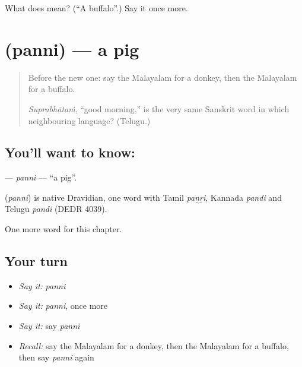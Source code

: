 \begin{tcolorbox}[breakable,colback=teal!4,colframe=teal!35!black,title={Before you move on}]
What does  mean? (\textquotedblleft{}A buffalo\textquotedblright{}.) Say it once more.
\end{tcolorbox}
\section[\texorpdfstring{\ml{പന്നി} (panni)}{പന്നി (panni)}]{ (panni) — a pig}

\label{lesson:ML-C151-panni}



\begin{quote}
Before the new one: say the Malayalam for a donkey, then the Malayalam for a buffalo.

\emph{Suprabhātaṁ}, \textquotedblleft{}good morning,\textquotedblright{} is the very same Sanskrit word in which neighbouring language? (Telugu.)
\end{quote}

\subsection*{You'll want to know: }
\textbf{} — \emph{panni} — \textquotedblleft{}a pig\textquotedblright{}.

\begin{cousinweb}
\textbf{} (\emph{panni}) is native Dravidian, one word with Tamil \emph{paṉṟi}, Kannada \emph{pandi} and Telugu \emph{pandi} (DEDR 4039).
\end{cousinweb}

\begin{grammarlens}[title={What you've built}]
One more word for this chapter.
\end{grammarlens}

\subsection*{Your turn}
\begin{itemize}
\raggedright
  \item \emph{Say it:} \emph{panni}
  \item \emph{Say it:} \emph{panni}, once more
  \item \emph{Say it:} say \emph{panni}
  \item \emph{Recall:} say the Malayalam for a donkey, then the Malayalam for a buffalo, then say \emph{panni} again
\end{itemize}

